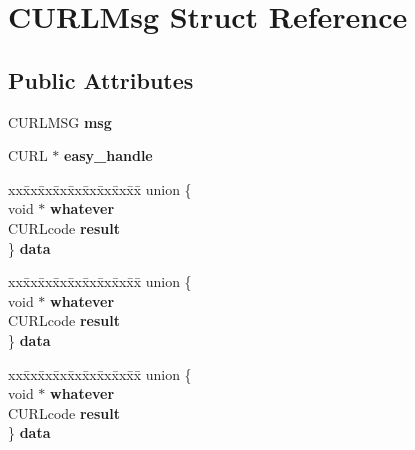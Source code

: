 \hypertarget{structCURLMsg}{}\section{C\+U\+R\+L\+Msg Struct Reference}
\label{structCURLMsg}
\subsection*{Public Attributes}
\begin{DoxyCompactItemize}
\item 
\mbox{\label{structCURLMsg_a805019ce36cd301163b184308220c601}} 
C\+U\+R\+L\+M\+SG {\bfseries msg}
\item 
\mbox{\label{structCURLMsg_a77d620fe6b5a3f4ccefff82b94b69c3f}} 
C\+U\+RL $\ast$ {\bfseries easy\+\_\+handle}
\item 
\mbox{\label{structCURLMsg_a5fb75918fa65c0a241c0a169c0223202}} 
\begin{tabbing}
xx\=xx\=xx\=xx\=xx\=xx\=xx\=xx\=xx\=\kill
union \{\\
\>void $\ast$ {\bfseries whatever}\\
\>CURLcode {\bfseries result}\\
\} {\bfseries data}\\

\end{tabbing}\item 
\mbox{\label{structCURLMsg_a89bbaa8a2e85c6cd46074a712f9c3050}} 
\begin{tabbing}
xx\=xx\=xx\=xx\=xx\=xx\=xx\=xx\=xx\=\kill
union \{\\
\>void $\ast$ {\bfseries whatever}\\
\>CURLcode {\bfseries result}\\
\} {\bfseries data}\\

\end{tabbing}\item 
\mbox{\label{structCURLMsg_ac2aa18995483e6d78cd2714c81df07e4}} 
\begin{tabbing}
xx\=xx\=xx\=xx\=xx\=xx\=xx\=xx\=xx\=\kill
union \{\\
\>void $\ast$ {\bfseries whatever}\\
\>CURLcode {\bfseries result}\\
\} {\bfseries data}\\


\end{tabbing}
\end{DoxyCompactItemize}

